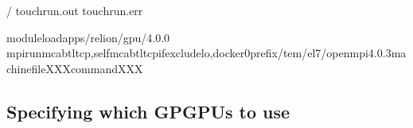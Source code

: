 \documentclass[a4paper,10pt,english]{sphinxmanual}
\begin{document}
\begin{sphinxVerbatim}[commandchars=\\\{\}]
/
touchrun.out
touchrun.err

moduleloadapps/relion/gpu/4.0.0
mpirun\PYGZhy{}\PYGZhy{}mcabtltcp,self\PYGZhy{}\PYGZhy{}mcabtl\PYGZus{}tcp\PYGZus{}if\PYGZus{}excludelo,docker0\PYGZhy{}\PYGZhy{}prefix/tem/el7/openmpi\PYGZhy{}4.0.3\PYGZhy{}machinefileXXXcommandXXX

\end{sphinxVerbatim}


\subsection{Specifying which GPGPUs to use}
\label{\detokenize{relion:specifying-which-gpgpus-to-use}}
\end{document}
